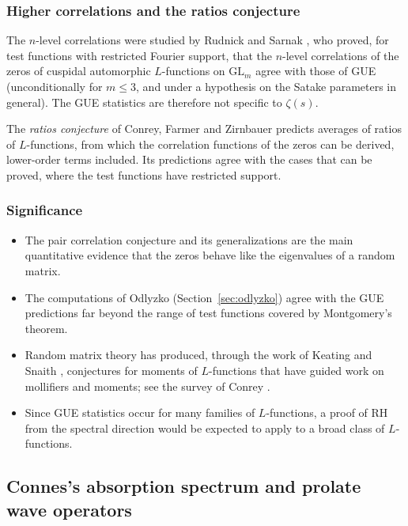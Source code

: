 \documentclass[11pt]{amsart}
\theoremstyle{definition}
\theoremstyle{remark}
\begin{document}
\subsubsection{Higher correlations and the ratios conjecture}

The $n$-level correlations were studied by Rudnick and Sarnak \cite{rudnick1996}, who proved, for test functions with restricted Fourier support, that the $n$-level correlations of the zeros of cuspidal automorphic $L$-functions on $\mathrm{GL}_m$ agree with those of GUE (unconditionally for $m\le3$, and under a hypothesis on the Satake parameters in general). The GUE statistics are therefore not specific to $\zeta(s)$.

The \emph{ratios conjecture} of Conrey, Farmer and Zirnbauer \cite{conrey2008} predicts averages of ratios of $L$-functions, from which the correlation functions of the zeros can be derived, lower-order terms included. Its predictions agree with the cases that can be proved, where the test functions have restricted support.

\subsubsection{Significance}

\begin{itemize}
\item The pair correlation conjecture and its generalizations are the main quantitative evidence that the zeros behave like the eigenvalues of a random matrix.
\item The computations of Odlyzko (Section~\ref{sec:odlyzko}) agree with the GUE predictions far beyond the range of test functions covered by Montgomery's theorem.
\item Random matrix theory has produced, through the work of Keating and Snaith \cite{keating2000}, conjectures for moments of $L$-functions that have guided work on mollifiers and moments; see the survey of Conrey \cite{conrey2003}.
\item Since GUE statistics occur for many families of $L$-functions, a proof of RH from the spectral direction would be expected to apply to a broad class of $L$-functions.
\end{itemize}

\subsection{Connes's absorption spectrum and prolate wave operators}\label{sec:connes-spectral}
\end{document}
